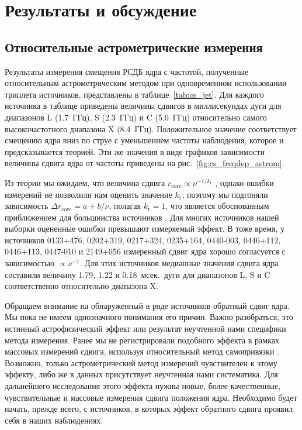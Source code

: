 \section{Результаты и обсуждение}

\subsection{Относительные астрометрические измерения}
Результаты измерения смещения РСДБ ядра с частотой, полученные относительным астрометрическим
методом при одновременном использовании триплета источников, представлены в
таблице~\ref{tab:cs_jet}. Для каждого источника в таблице приведены величины сдвигов в миллисекундах
дуги для диапазонов L (1.7~ГГц), S (2.3~ГГц) и C (5.0~ГГц) относительно самого высокочастотного
диапазона X (8.4~ГГц). Положительное значение соответствует смещению ядра вниз по струе с
уменьшением частоты наблюдения, которое и предсказывается теорией. Эти же значения в виде графиков
зависимости величины сдвига ядра от частоты приведены на рис.~\ref{fig:cs_freqdep_astrom}.

Из теории мы ожидаем, что величина сдвига $r_\mathrm{core} \propto \nu^{-1/k_{\mathrm{r}}}$
\cite{Lobanov_1998}, однако ошибки измерений не позволили нам оценить значение $k_{\mathrm{r}}$,
поэтому мы подгоняли зависимость $\Delta r_\mathrm{core} = a + b/\nu$, полагая $k_\mathrm{r} = 1$,
что является обоснованным приближением для большинства источников \cite{Sokolovsky_2011}.
Для многих источников нашей выборки оцененные ошибки превышают измеряемый эффект. В тоже время, у
источников 0133+476, 0202+319, 0217+324, 0235+164, 0440-003, 0446+112, 0446+113, 0447-010
и 2149+056 измеренный сдвиг ядра хорошо согласуется с зависимостью $\propto \nu^{-1}$. Для этих
источников медианные значения сдвига ядра составили величину 1.79, 1.22 и 0.18~мсек.~дуги для
диапазонов L, S и C соответственно относительно диапазона X.

Обращаем внимание на обнаруженный в ряде источников обратный сдвиг ядра. Мы пока не имеем
однозначного понимания его причин. Важно разобраться, это истинный астрофизический эффект или
результат неучтенной нами специфики метода измерения. Ранее мы не регистрировали подобного эффекта в
рамках массовых измерений сдвига, используя относительный метод самопривязки
\cite{Pushkarev_2012,Plavin2018}. Возможно, только астрометрический метод измерений чувствителен к
этому эффекту, либо же в данных присутствует неучтенная нами систематика. Для дальнейшего
исследования этого эффекта нужны новые, более качественные, чувствительные и массовые измерения
сдвига положения ядра. Необходимо будет начать, прежде всего, с источников, в которых эффект
обратного сдвига проявил себя в наших наблюдениях.

